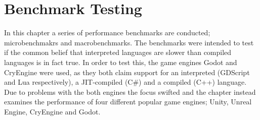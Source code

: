 \chapter{Benchmark Testing} \label{chap:benchmarks}
In this chapter a series of performance benchmarks are conducted; microbenchmakrs \cite{sestoft2013microbenchmarks,sestoft2010numeric} and macrobenchmarks. The benchmarks were intended to test if the common belief that interpreted languages are slower than compiled languages is in fact true. In order to test this, the game engines Godot and CryEngine were used, as they both claim support for an interpreted (GDScript and Lua respectively), a \ac{JIT}-compiled (C\#) and a compiled (C++) language. Due to problems with the both engines the focus swifted and the chapter instead examines the performance of four different popular game engines; Unity, Unreal Engine, CryEngine and Godot.





